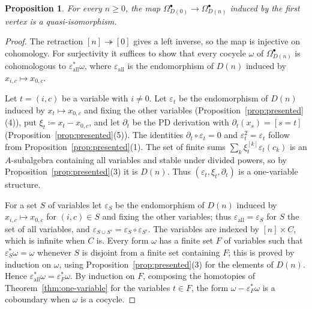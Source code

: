 \documentclass[11pt]{amsart}
\newcommand{\spa}{\medskip}
\newcommand{\dpow}[1]{^{[#1]}}
\theoremstyle{plain}
\newtheorem{proposition}[theorem]{Proposition}
\theoremstyle{definition}
\theoremstyle{remark}
\begin{document}
\begin{proposition}\label{prop:poincare}
For every $n \ge 0$, the map $\Omega^\bullet_{D(0)} \to \Omega^\bullet_{D(n)}$ induced by the first vertex is a quasi-isomorphism.
\end{proposition}

\begin{proof}
The retraction $[n] \twoheadrightarrow [0]$ gives a left inverse, so the map is injective on cohomology. For surjectivity it suffices to show that every cocycle $\omega$ of $\Omega^\bullet_{D(n)}$ is cohomologous to $\varepsilon_{\mathrm{all}}^* \omega$, where $\varepsilon_{\mathrm{all}}$ is the endomorphism of $D(n)$ induced by $x_{i,c} \mapsto x_{0,c}$.

\spa

Let $t = (i,c)$ be a variable with $i \ne 0$. Let $\varepsilon_t$ be the endomorphism of $D(n)$ induced by $x_t \mapsto x_{0,c}$ and fixing the other variables (Proposition~\ref{prop:presented}(4)), put $\xi_t \coloneqq x_t - x_{0,c}$, and let $\partial_t$ be the PD derivation with $\partial_t(x_s) = [s = t]$ (Proposition~\ref{prop:presented}(5)). The identities $\partial_t \circ \varepsilon_t = 0$ and $\varepsilon_t^2 = \varepsilon_t$ follow from Proposition~\ref{prop:presented}(1). The set of finite sums $\sum_k \xi_t\dpow{k}\varepsilon_t(c_k)$ is an $A$-subalgebra containing all variables and stable under divided powers, so by Proposition~\ref{prop:presented}(3) it is $D(n)$. Thus $(\varepsilon_t, \xi_t, \partial_t)$ is a one-variable structure.

\spa

For a set $S$ of variables let $\varepsilon_S$ be the endomorphism of $D(n)$ induced by $x_{i,c} \mapsto x_{0,c}$ for $(i,c) \in S$ and fixing the other variables; thus $\varepsilon_{\mathrm{all}} = \varepsilon_S$ for $S$ the set of all variables, and $\varepsilon_{S \cup S'} = \varepsilon_S \circ \varepsilon_{S'}$. The variables are indexed by $[n] \times C$, which is infinite when $C$ is. Every form $\omega$ has a finite set $F$ of variables such that $\varepsilon_{S}^*\omega = \omega$ whenever $S$ is disjoint from a finite set containing $F$; this is proved by induction on $\omega$, using Proposition~\ref{prop:presented}(3) for the elements of $D(n)$. Hence $\varepsilon_{\mathrm{all}}^*\omega = \varepsilon_F^*\omega$. By induction on $F$, composing the homotopies of Theorem~\ref{thm:one-variable} for the variables $t \in F$, the form $\omega - \varepsilon_F^*\omega$ is a coboundary when $\omega$ is a cocycle.
\end{proof}
\end{document}
